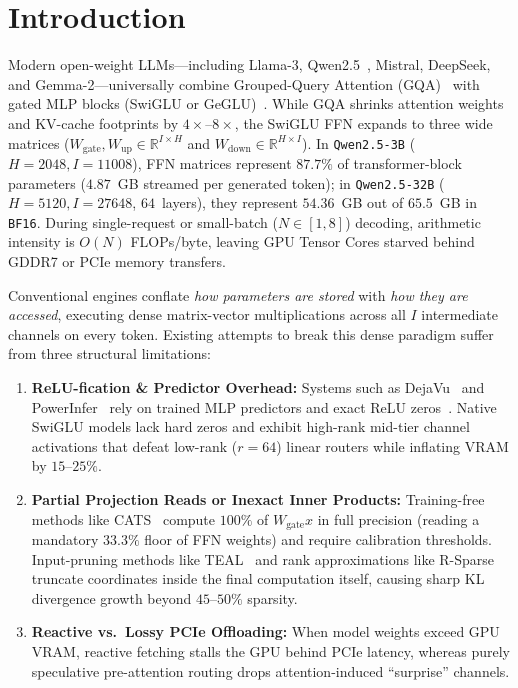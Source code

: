 \documentclass[10pt,twocolumn]{article}
\begin{document}
\section{Introduction}
Modern open-weight LLMs---including Llama-3, Qwen2.5~\cite{qwen25_2024}, Mistral, DeepSeek, and Gemma-2---universally combine Grouped-Query Attention (GQA)~\cite{ainslie2023gqa} with gated MLP blocks (SwiGLU or GeGLU)~\cite{shazeer2020glu}. While GQA shrinks attention weights and KV-cache footprints by $4\times\text{--}8\times$, the SwiGLU FFN expands to three wide matrices ($W_{\mathrm{gate}}, W_{\mathrm{up}} \in \mathbb{R}^{I\times H}$ and $W_{\mathrm{down}} \in \mathbb{R}^{H\times I}$). In \texttt{Qwen2.5-3B} ($H=2048, I=11008$), FFN matrices represent $87.7\%$ of transformer-block parameters ($4.87$~GB streamed per generated token); in \texttt{Qwen2.5-32B} ($H=5120, I=27648$, $64$~layers), they represent $54.36$~GB out of $65.5$~GB in \texttt{BF16}. During single-request or small-batch ($N\in[1,8]$) decoding, arithmetic intensity is $O(N)$ FLOPs/byte, leaving GPU Tensor Cores starved behind GDDR7 or PCIe memory transfers.

Conventional engines conflate \emph{how parameters are stored} with \emph{how they are accessed}, executing dense matrix-vector multiplications across all $I$ intermediate channels on every token. Existing attempts to break this dense paradigm suffer from three structural limitations:
\begin{enumerate}
  \item \textbf{ReLU-fication \& Predictor Overhead:} Systems such as DejaVu~\cite{liu2023dejavu} and PowerInfer~\cite{song2024powerinfer} rely on trained MLP predictors and exact ReLU zeros~\cite{mirzadeh2024relustrikesback}. Native SwiGLU models lack hard zeros and exhibit high-rank mid-tier channel activations that defeat low-rank ($r=64$) linear routers while inflating VRAM by $15\text{--}25\%$.
  \item \textbf{Partial Projection Reads or Inexact Inner Products:} Training-free methods like CATS~\cite{lee2024cats} compute $100\%$ of $W_{\mathrm{gate}} x$ in full precision (reading a mandatory $33.3\%$ floor of FFN weights) and require calibration thresholds. Input-pruning methods like TEAL~\cite{liu2025teal} and rank approximations like R-Sparse~\cite{zhang2025rsparse} truncate coordinates inside the final computation itself, causing sharp KL divergence growth beyond $45\text{--}50\%$ sparsity.
  \item \textbf{Reactive vs.\ Lossy PCIe Offloading:} When model weights exceed GPU VRAM, reactive fetching stalls the GPU behind PCIe latency, whereas purely speculative pre-attention routing drops attention-induced ``surprise'' channels.
\end{enumerate}
\end{document}
